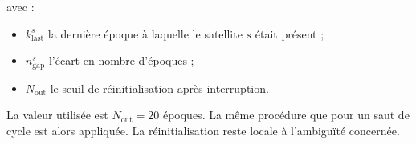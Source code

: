 avec :

\begin{itemize}
    \item $k_{\mathrm{last}}^s$ la dernière époque à laquelle le satellite $s$
    était présent ;
    \item $n_{\mathrm{gap}}^s$ l'écart en nombre d'époques ;
    \item $N_{\mathrm{out}}$ le seuil de réinitialisation après interruption.
\end{itemize}

La valeur utilisée est $N_{\mathrm{out}}=20$ époques. La même procédure que
pour un saut de cycle est alors appliquée. La réinitialisation reste locale à
l'ambiguïté concernée.
